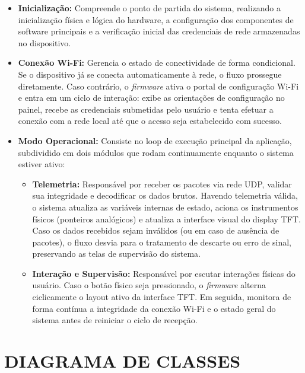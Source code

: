 \documentclass[
  12pt,
  oneside,
  a4paper,
  chapter=TITLE,
  section=TITLE,
  subsection=TITLE,
  brazil
]{abntex2}
\newcommand{\estrangeirismo}[1]{\textit{#1}}
\begin{document}
\begin{itemize}
    \item \textbf{Inicialização:} Compreende o ponto de partida do sistema, realizando a inicialização física e lógica do hardware, a configuração dos componentes de software principais e a verificação inicial das credenciais de rede armazenadas no dispositivo.
    
    \item \textbf{Conexão Wi-Fi:} Gerencia o estado de conectividade de forma condicional. Se o dispositivo já se conecta automaticamente à rede, o fluxo prossegue diretamente. Caso contrário, o \estrangeirismo{firmware} ativa o portal de configuração Wi-Fi e entra em um ciclo de interação: exibe as orientações de configuração no painel, recebe as credenciais submetidas pelo usuário e tenta efetuar a conexão com a rede local até que o acesso seja estabelecido com sucesso.
    
    \item \textbf{Modo Operacional:} Consiste no loop de execução principal da aplicação, subdividido em dois módulos que rodam continuamente enquanto o sistema estiver ativo:
    \begin{itemize}
        \item \textbf{Telemetria:} Responsável por receber os pacotes via rede UDP, validar sua integridade e decodificar os dados brutos. Havendo telemetria válida, o sistema atualiza as variáveis internas de estado, aciona os instrumentos físicos (ponteiros analógicos) e atualiza a interface visual do display TFT. Caso os dados recebidos sejam inválidos (ou em caso de ausência de pacotes), o fluxo desvia para o tratamento de descarte ou erro de sinal, preservando as telas de supervisão do sistema.
        \item \textbf{Interação e Supervisão:} Responsável por escutar interações físicas do usuário. Caso o botão físico seja pressionado, o \estrangeirismo{firmware} alterna ciclicamente o layout ativo da interface TFT. Em seguida, monitora de forma contínua a integridade da conexão Wi-Fi e o estado geral do sistema antes de reiniciar o ciclo de recepção.
    \end{itemize}
\end{itemize} %

\section{DIAGRAMA DE CLASSES}
\end{document}
